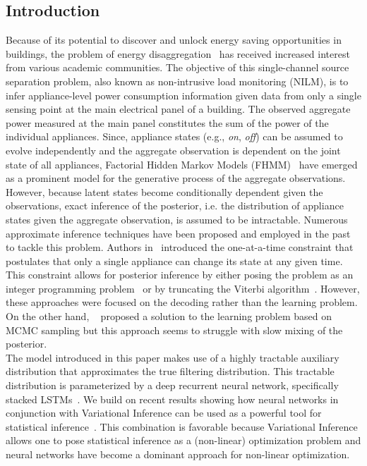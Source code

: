 \subsection{Introduction}
Because of its potential to discover and unlock energy saving opportunities in buildings, the problem of energy disaggregation~\cite{hart1992} has received increased interest from various academic communities. The objective of this single-channel source separation problem, also known as non-intrusive load monitoring (NILM), is to infer appliance-level power consumption information given data from only a single sensing point at the main electrical panel of a building. The observed aggregate power measured at the main panel constitutes the sum of the power of the individual appliances. Since, appliance states (e.g., {\em on}, {\em off}) can be assumed to evolve independently and the aggregate observation is dependent on the joint state of all appliances, Factorial Hidden Markov Models (FHMM)~\cite{ghahramani1997factorial} have emerged as a prominent model for the generative process of the aggregate observations. However, because latent states become conditionally dependent given the observations, exact inference of the posterior, i.e. the distribution of appliance states given the aggregate observation, is assumed to be intractable. Numerous approximate inference techniques have been proposed and employed in the past to tackle this problem. Authors in~\cite{kolter2012fhmm} introduced the one-at-a-time constraint that postulates that only a single appliance can change its state at any given time. This constraint allows for posterior inference by either posing the problem as an integer programming problem~\cite{kolter2012fhmm} or by truncating the Viterbi algorithm~\cite{lange2016efficient}. However, these approaches were focused on the decoding rather than the learning problem. On the other hand, ~\cite{jia2015fully} proposed a solution to the learning problem based on MCMC sampling but this approach seems to struggle with slow mixing of the posterior.\\
The model introduced in this paper makes use of a highly tractable auxiliary distribution that approximates the true filtering distribution. This tractable distribution is parameterized by a deep recurrent neural network, specifically stacked LSTMs~\cite{hochreiter1997long}. We build on recent results showing how neural networks in conjunction with Variational Inference can be used as a powerful tool for statistical inference~\cite{kingma2013auto}. This combination is favorable because Variational Inference allows one to pose statistical inference as a (non-linear) optimization problem and neural networks have become a dominant approach for non-linear optimization.\\
